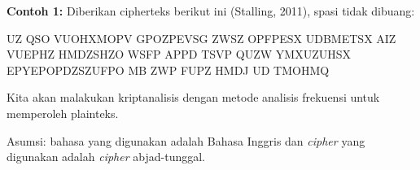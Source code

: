 \documentclass{article}
\begin{document}

\textbf{Contoh 1:} Diberikan cipherteks berikut ini (Stalling, 2011), spasi tidak dibuang:

UZ QSO VUOHXMOPV GPOZPEVSG ZWSZ OPFPESX UDBMETSX AIZ
VUEPHZ HMDZSHZO WSFP APPD TSVP QUZW YMXUZUHSX
EPYEPOPDZSZUFPO MB ZWP FUPZ HMDJ UD TMOHMQ

\vspace{5mm}

Kita akan malakukan kriptanalisis dengan metode analisis frekuensi untuk memperoleh plainteks.

\vspace{5mm}

Asumsi: bahasa yang digunakan adalah Bahasa Inggris dan \textit{cipher} yang digunakan adalah \textit{cipher} abjad-tunggal.
\end{document}
